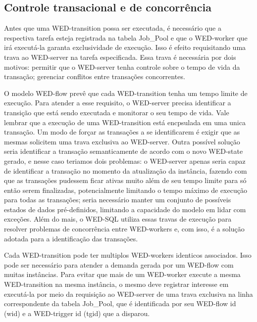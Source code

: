 \documentclass[conference]{IEEEtran}
\begin{document}
\subsection{Controle transacional e de concorrência}

Antes que uma WED-transition possa ser executada, é necessário que a respectiva tarefa esteja registrada na tabela Job\_Pool e que
o WED-worker que irá executá-la garanta exclusividade de execução. Isso é efeito requisitando uma trava ao WED-server na tarefa
especificada. Essa trava é necessária por dois motivos: permitir que o WED-server tenha controle sobre o tempo de vida da transação;
gerenciar conflitos entre transações concorrentes.

\par O modelo WED-flow prevê que cada WED-transition tenha um tempo limite de execução. Para atender a esse requisito, o WED-server
precisa identificar a transição que está sendo executada e monitorar o seu tempo de vida. Vale lembrar que a execução de uma
WED-transition está encpsulada em uma unica transação. Um modo de forçar as transações a se identificarem é exigir que as mesmas
solicitem uma trava exclusiva ao WED-server. Outra possível solução seria identificar a transação semanticamente de acordo
com o novo WED-state gerado, e nesse caso teriamos dois problemas: o WED-server apenas seria capaz de identificar a transação
no momento da atualização da instância, fazendo com que as transações pudessem ficar ativas muito além de seu tempo limite para
só então serem finalizadas, potencialmente limitando o tempo máximo de execução para todas as transações; seria necessário manter 
um conjunto de possíveis estados de dados pré-definidos, limitando a capacidade do modelo em lidar com exceções. Além do mais,
o WED-SQL utiliza essas travas de execução para resolver problemas de concorrência entre WED-workers e, com isso,
é a solução adotada para a identificação das transações. 


\par Cada WED-transition pode ter multiplos WED-workers identicos associados. Isso pode ser necessário para atender a demanda 
gerada por um WED-flow com muitas instâncias. Para evitar que mais de um WED-worker execute a mesma WED-transition na mesma
instância, o mesmo deve registrar interesse em executá-la por meio da requisição ao WED-server de uma trava exclusiva na linha
correspondente da tabela Job\_Pool, que é identificada por seu WED-flow id (wid) e a WED-trigger id (tgid) que a disparou.
\end{document}
